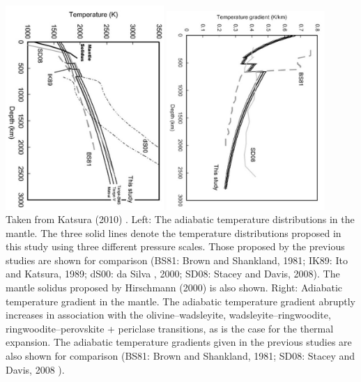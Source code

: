\begin{center}
\includegraphics[width=6cm]{images/adiabatic/kayy10a}
\includegraphics[width=6cm]{images/adiabatic/kayy10b}\\
{\captionfont Taken from Katsura \etal (2010) \cite{kayy10}.
Left: The adiabatic temperature distributions in the mantle. The three solid lines
denote the temperature distributions proposed in this study using three different
pressure scales. Those proposed by the previous studies are shown for comparison
(BS81: Brown and Shankland, 1981; IK89: Ito and Katsura, 1989; dS00: da Silva \etal,
2000; SD08: Stacey and Davis, 2008). The mantle solidus proposed by Hirschmann
(2000) is also shown.
Right:
Adiabatic temperature gradient in the mantle. The adiabatic temperature gradient 
abruptly increases in association with the olivine–wadsleyite,
wadsleyite–ringwoodite, ringwoodite–perovskite + periclase transitions, as is the
case for the thermal expansion. The adiabatic temperature gradients given in the
previous studies are also shown for comparison (BS81: Brown and Shankland, 1981;
SD08: Stacey and Davis, 2008 \cite{stacey_davis}).
}
\end{center}


